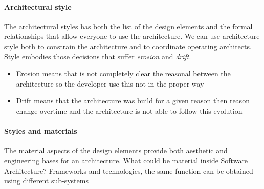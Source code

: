 \paragraph{Architectural style}
The architectural styles has both the list of the design elements and the formal relationships that allow everyone to use the architecture. We can use architecture style both to constrain the architecture and to coordinate operating
architects. Style embodies those decisions that suffer \textit{erosion} and \textit{drift}.
\begin{itemize}
    \item Erosion means that is not completely clear the reasonal between the architecture so the developer use this not in the proper way
    \item Drift means that the architecture was build for a given reason then reason change overtime and the architecture is not able to follow this evolution
\end{itemize}

\paragraph{Styles and materials}
The material aspects of the design elements provide both aesthetic and engineering bases for an architecture. What could be material inside Software Architecture? Frameworks and technologies, the same function can be obtained
using different sub-systems

